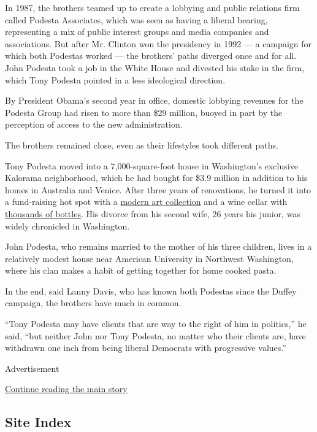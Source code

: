 In 1987, the brothers teamed up to create a lobbying and public
relations firm called Podesta Associates, which was seen as having a
liberal bearing, representing a mix of public interest groups and media
companies and associations. But after Mr. Clinton won the presidency in
1992 --- a campaign for which both Podestas worked --- the brothers'
paths diverged once and for all. John Podesta took a job in the White
House and divested his stake in the firm, which Tony Podesta pointed in
a less ideological direction.

By President Obama's second year in office, domestic lobbying revenues
for the Podesta Group had risen to more than \$29 million, buoyed in
part by the perception of access to the new administration.

The brothers remained close, even as their lifestyles took different
paths.

Tony Podesta moved into a 7,000-square-foot house in Washington's
exclusive Kalorama neighborhood, which he had bought for \$3.9 million
in addition to his homes in Australia and Venice. After three years of
renovations, he turned it into a fund-raising hot spot with a
\href{http://washingtonlife.com/2015/06/05/inside-homes-private-viewing/}{modern
art collection} and a wine cellar with
\href{http://www.washingtonpost.com/wp-dyn/content/article/2009/08/23/AR2009082302381_4.html}{thousands
of bottles}. His divorce from his second wife, 26 years his junior, was
widely chronicled in Washington.

John Podesta, who remains married to the mother of his three children,
lives in a relatively modest house near American University in Northwest
Washington, where his clan makes a habit of getting together for home
cooked pasta.

In the end, said Lanny Davis, who has known both Podestas since the
Duffey campaign, the brothers have much in common.

``Tony Podesta may have clients that are way to the right of him in
politics,'' he said, ``but neither John nor Tony Podesta, no matter who
their clients are, have withdrawn one inch from being liberal Democrats
with progressive values.''

Advertisement

\protect\hyperlink{after-bottom}{Continue reading the main story}

\hypertarget{site-index}{%
\subsection{Site Index}\label{site-index}}

